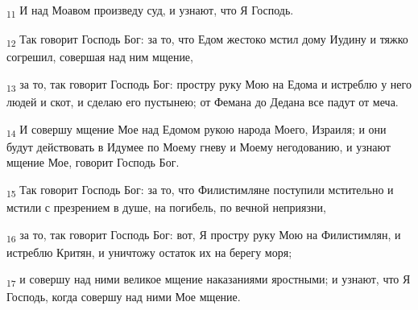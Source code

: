 \begin{tcolorbox}
\textsubscript{11} И над Моавом произведу суд, и узнают, что Я Господь.
\end{tcolorbox}
\begin{tcolorbox}
\textsubscript{12} Так говорит Господь Бог: за то, что Едом жестоко мстил дому Иудину и тяжко согрешил, совершая над ним мщение,
\end{tcolorbox}
\begin{tcolorbox}
\textsubscript{13} за то, так говорит Господь Бог: простру руку Мою на Едома и истреблю у него людей и скот, и сделаю его пустынею; от Фемана до Дедана все падут от меча.
\end{tcolorbox}
\begin{tcolorbox}
\textsubscript{14} И совершу мщение Мое над Едомом рукою народа Моего, Израиля; и они будут действовать в Идумее по Моему гневу и Моему негодованию, и узнают мщение Мое, говорит Господь Бог.
\end{tcolorbox}
\begin{tcolorbox}
\textsubscript{15} Так говорит Господь Бог: за то, что Филистимляне поступили мстительно и мстили с презрением в душе, на погибель, по вечной неприязни,
\end{tcolorbox}
\begin{tcolorbox}
\textsubscript{16} за то, так говорит Господь Бог: вот, Я простру руку Мою на Филистимлян, и истреблю Критян, и уничтожу остаток их на берегу моря;
\end{tcolorbox}
\begin{tcolorbox}
\textsubscript{17} и совершу над ними великое мщение наказаниями яростными; и узнают, что Я Господь, когда совершу над ними Мое мщение.
\end{tcolorbox}
